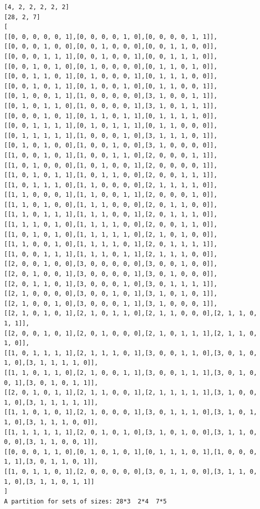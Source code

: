 \documentclass[final]{dmtcs-episciences}
\begin{document}
\begin{appendices}
\begin{verbatim} 
[4, 2, 2, 2, 2, 2]
[28, 2, 7]
[
[[0, 0, 0, 0, 0, 1],[0, 0, 0, 0, 1, 0],[0, 0, 0, 0, 1, 1]],
[[0, 0, 0, 1, 0, 0],[0, 0, 1, 0, 0, 0],[0, 0, 1, 1, 0, 0]],
[[0, 0, 0, 1, 1, 1],[0, 0, 1, 0, 0, 1],[0, 0, 1, 1, 1, 0]],
[[0, 0, 1, 0, 1, 0],[0, 1, 0, 0, 0, 0],[0, 1, 1, 0, 1, 0]],
[[0, 0, 1, 1, 0, 1],[0, 1, 0, 0, 0, 1],[0, 1, 1, 1, 0, 0]],
[[0, 0, 1, 0, 1, 1],[0, 1, 0, 0, 1, 0],[0, 1, 1, 0, 0, 1]],
[[0, 1, 0, 0, 1, 1],[1, 0, 0, 0, 0, 0],[3, 1, 0, 0, 1, 1]],
[[0, 1, 0, 1, 1, 0],[1, 0, 0, 0, 0, 1],[3, 1, 0, 1, 1, 1]],
[[0, 0, 0, 1, 0, 1],[0, 1, 1, 0, 1, 1],[0, 1, 1, 1, 1, 0]],
[[0, 0, 1, 1, 1, 1],[0, 1, 0, 1, 1, 1],[0, 1, 1, 0, 0, 0]],
[[0, 1, 1, 1, 1, 1],[1, 0, 0, 0, 1, 0],[3, 1, 1, 1, 0, 1]],
[[0, 1, 0, 1, 0, 0],[1, 0, 0, 1, 0, 0],[3, 1, 0, 0, 0, 0]],
[[1, 0, 0, 1, 0, 1],[1, 0, 0, 1, 1, 0],[2, 0, 0, 0, 1, 1]],
[[1, 0, 1, 0, 0, 0],[1, 0, 1, 0, 0, 1],[2, 0, 0, 0, 0, 1]],
[[1, 0, 1, 0, 1, 1],[1, 0, 1, 1, 0, 0],[2, 0, 0, 1, 1, 1]],
[[1, 0, 1, 1, 1, 0],[1, 1, 0, 0, 0, 0],[2, 1, 1, 1, 1, 0]],
[[1, 1, 0, 0, 0, 1],[1, 1, 0, 0, 1, 1],[2, 0, 0, 0, 1, 0]],
[[1, 1, 0, 1, 0, 0],[1, 1, 1, 0, 0, 0],[2, 0, 1, 1, 0, 0]],
[[1, 1, 0, 1, 1, 1],[1, 1, 1, 0, 0, 1],[2, 0, 1, 1, 1, 0]],
[[1, 1, 1, 0, 1, 0],[1, 1, 1, 1, 0, 0],[2, 0, 0, 1, 1, 0]],
[[1, 0, 1, 0, 1, 0],[1, 1, 1, 1, 1, 0],[2, 1, 0, 1, 0, 0]],
[[1, 1, 0, 0, 1, 0],[1, 1, 1, 1, 0, 1],[2, 0, 1, 1, 1, 1]],
[[1, 0, 0, 1, 1, 1],[1, 1, 1, 0, 1, 1],[2, 1, 1, 1, 0, 0]],
[[2, 0, 0, 1, 0, 0],[3, 0, 0, 0, 0, 0],[3, 0, 0, 1, 0, 0]],
[[2, 0, 1, 0, 0, 1],[3, 0, 0, 0, 0, 1],[3, 0, 1, 0, 0, 0]],
[[2, 0, 1, 1, 0, 1],[3, 0, 0, 0, 1, 0],[3, 0, 1, 1, 1, 1]],
[[2, 1, 0, 0, 0, 0],[3, 0, 0, 1, 0, 1],[3, 1, 0, 1, 0, 1]],
[[2, 1, 0, 0, 1, 0],[3, 0, 0, 0, 1, 1],[3, 1, 0, 0, 0, 1]],
[[2, 1, 0, 1, 0, 1],[2, 1, 0, 1, 1, 0],[2, 1, 1, 0, 0, 0],[2, 1, 1, 0, 1, 1]],
[[2, 0, 0, 1, 0, 1],[2, 0, 1, 0, 0, 0],[2, 1, 0, 1, 1, 1],[2, 1, 1, 0, 1, 0]],
[[1, 0, 1, 1, 1, 1],[2, 1, 1, 1, 0, 1],[3, 0, 0, 1, 1, 0],[3, 0, 1, 0, 1, 0],[3, 1, 1, 1, 1, 0]],
[[1, 1, 0, 1, 1, 0],[2, 1, 0, 0, 1, 1],[3, 0, 0, 1, 1, 1],[3, 0, 1, 0, 0, 1],[3, 0, 1, 0, 1, 1]],
[[2, 0, 1, 0, 1, 1],[2, 1, 1, 0, 0, 1],[2, 1, 1, 1, 1, 1],[3, 1, 0, 0, 1, 0],[3, 1, 1, 1, 1, 1]],
[[1, 1, 0, 1, 0, 1],[2, 1, 0, 0, 0, 1],[3, 0, 1, 1, 1, 0],[3, 1, 0, 1, 1, 0],[3, 1, 1, 1, 0, 0]],
[[1, 1, 1, 1, 1, 1],[2, 0, 1, 0, 1, 0],[3, 1, 0, 1, 0, 0],[3, 1, 1, 0, 0, 0],[3, 1, 1, 0, 0, 1]],
[[0, 0, 0, 1, 1, 0],[0, 1, 0, 1, 0, 1],[0, 1, 1, 1, 0, 1],[1, 0, 0, 0, 1, 1],[3, 0, 1, 1, 0, 1]],
[[1, 0, 1, 1, 0, 1],[2, 0, 0, 0, 0, 0],[3, 0, 1, 1, 0, 0],[3, 1, 1, 0, 1, 0],[3, 1, 1, 0, 1, 1]]
]
A partition for sets of sizes: 28*3  2*4  7*5
\end{verbatim}
\newpage


\end{appendices}
\end{document}
